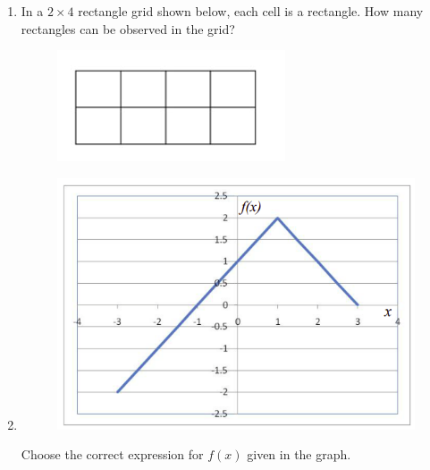 \documentclass[journal,12pt,onecolumn]{IEEEtran}
\theoremstyle{remark}
\begin{document}
\begin{enumerate}[start=1, label=Q.\arabic*]
    \hfill{}

    \item In a $2 \times 4$ rectangle grid shown below, each cell is a rectangle. How many rectangles can be observed in the grid?
    \begin{figure}[H]
        \includegraphics[width=0.6\columnwidth]{Figures/q9.png}
        \centering
        \caption{}
    \end{figure}
    \begin{enumerate}
    \end{enumerate}

    \hfill{}

    \item 
    \begin{figure}[H]
        \includegraphics[width=0.6\columnwidth]{Figures/1q10.png}
        \caption{}
    \end{figure}
    Choose the correct expression for $f(x)$ given in the graph.
    \begin{enumerate}
    \end{enumerate}


\end{enumerate}
\end{document}
